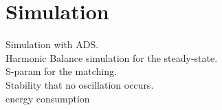 \chapter{Simulation}
Simulation  with ADS. \\Harmonic Balance simulation for the steady-state.\\ S-param for the matching.\\ Stability that no oscillation occurs. \\ energy consumption\\